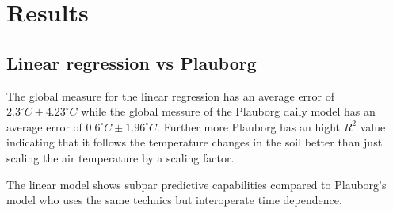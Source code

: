 \section{Results}


\begin{table}
	\centering
	\begin{adjustwidth}{-1in}{-1in}
		\resizebox{1.35\textwidth}{!}{
			
		}
	\end{adjustwidth}
\end{table}


\begin{table}
	\centering
	\begin{adjustwidth}{-1in}{-1in}
		\resizebox{1.35\textwidth}{!}{
			
		}
	\end{adjustwidth}
\end{table}

\begin{table}
	\centering
	\begin{adjustwidth}{-1in}{-1in}
		\resizebox{1.35\textwidth}{!}{
			
		}
	\end{adjustwidth}
\end{table}


\begin{table}
	\centering
	\begin{adjustwidth}{-1in}{-1in}
		\resizebox{1.35\textwidth}{!}{
			
		}
	\end{adjustwidth}
\end{table}

\subsection{Linear regression vs Plauborg}

The global measure for the linear regression has an average error of $2.3^\circ C \pm 4.23^\circ C$ while the global messure of the Plauborg daily model has an average error of $0.6^\circ C \pm 1.96^\circ C$. Further more Plauborg has an hight $R^2$ value indicating that it follows the temperature changes in the soil better than just scaling the air temperature by a scaling factor.

The linear model shows subpar predictive capabilities compared to Plauborg's model who uses the same technics but interoperate time dependence. 

